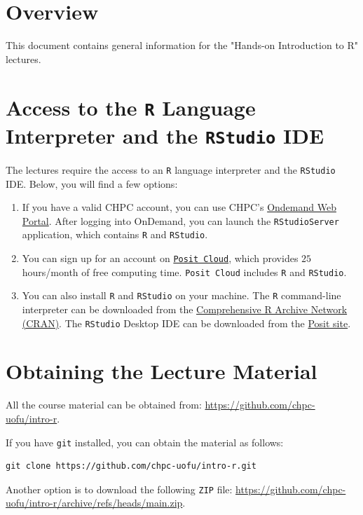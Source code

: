 \section*{Overview}

This document contains general information for the "Hands-on Introduction to R" lectures.\newline

\section{Access to the \texttt{R} Language Interpreter and the \texttt{RStudio} IDE}

The lectures require the access to an \texttt{R} language interpreter and the \texttt{RStudio} IDE.\newline
Below, you will find a few options:

\begin{enumerate}
\item If you have a valid CHPC account, you can use CHPC's \href{http://ondemand.chpc.utah.edu/}{Ondemand Web Portal}.\newline
      After logging into OnDemand, you can launch the \texttt{RStudioServer} application, which contains \texttt{R} and \texttt{RStudio}.

\item You can sign up for an account on \href{https://posit.cloud/}{\texttt{Posit\,Cloud}}, 
	which provides $25$ hours/month of free computing time.\newline
      \texttt{Posit\,Cloud} includes \texttt{R} and \texttt{RStudio}. 

\item You can also install \texttt{R} and \texttt{RStudio} on your machine. The \texttt{R} command-line 
	interpreter can be downloaded from the \href{https://cran.r-project.org/}{Comprehensive R Archive Network (CRAN)}.
      The \texttt{RStudio} Desktop IDE can be downloaded from the \href{https://posit.co/downloads/}{Posit site}.
\end{enumerate}



\section{Obtaining the Lecture Material}
All the course material can be obtained from: \href{https://github.com/chpc-uofu/intro-r}{https://github.com/chpc-uofu/intro-r}.

If you have \texttt{git} installed, you can obtain the material as follows:
\begin{verbatim}
git clone https://github.com/chpc-uofu/intro-r.git
\end{verbatim}
Another option is to download the following \texttt{ZIP} file: \newline 
\href{https://github.com/chpc-uofu/intro-r/archive/refs/heads/main.zip}{https://github.com/chpc-uofu/intro-r/archive/refs/heads/main.zip}.

